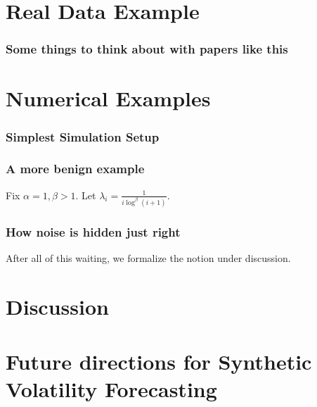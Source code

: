 \documentclass{beamer}
\begin{document}
\section{Real Data Example}

\begin{frame}
\frametitle{Some things to think about with papers like this}

\end{frame}


\section{Numerical Examples}

\begin{frame}
\fontsize{8pt}{9pt}
\frametitle{Simplest Simulation Setup}

\end{frame}

\begin{frame}
\frametitle{A more benign example}

\begin{example}
Fix $\alpha = 1, \beta > 1$.  Let $\lambda_{i} = \frac{1}{i \log^{\beta}(i+1)}$.

\end{example}

\end{frame}

\begin{frame}
\frametitle{How noise is hidden just right}

\end{frame}

\begin{frame}
After all of this waiting, we formalize the notion under discussion.

\begin{definition}

\end{definition}
\end{frame}


\section{Discussion}

\section{Future directions for Synthetic Volatility Forecasting}
\end{document}

